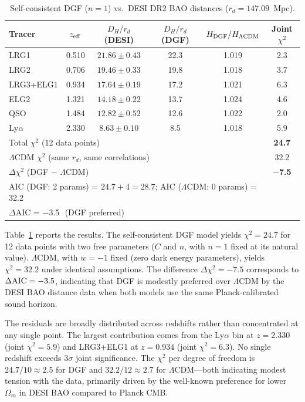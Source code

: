 \documentclass[12pt,a4paper]{article}
\begin{document}
\begin{table}[htbp]
\centering
\caption{Self-consistent DGF ($n=1$) vs.\ DESI DR2 BAO distances ($r_d=147.09$~Mpc).}
\label{tab:desi}
\begin{tabular}{lccccc}
\toprule
Tracer & $z_{\rm eff}$ & $D_H/r_d$ (DESI) & $D_H/r_d$ (DGF) & $H_{\rm DGF}/H_{\Lambda\rm CDM}$ & Joint $\chi^2$ \\
\midrule
LRG1      & 0.510 & $21.86\pm0.43$ & 22.3 & 1.019 & 2.3 \\
LRG2      & 0.706 & $19.46\pm0.33$ & 19.8 & 1.018 & 3.7 \\
LRG3+ELG1 & 0.934 & $17.64\pm0.19$ & 17.2 & 1.021 & 6.3 \\
ELG2      & 1.321 & $14.18\pm0.22$ & 13.7 & 1.024 & 4.6 \\
QSO       & 1.484 & $12.82\pm0.52$ & 12.6 & 1.022 & 2.0 \\
Ly$\alpha$ & 2.330 & $8.63\pm0.10$  & 8.5  & 1.018 & 5.9 \\
\midrule
\multicolumn{5}{l}{Total $\chi^2$ (12 data points)} & {\bf 24.7} \\
\multicolumn{5}{l}{$\Lambda$CDM $\chi^2$ (same $r_d$, same correlations)} & 32.2 \\
\multicolumn{5}{l}{$\Delta\chi^2$ (DGF $-$ $\Lambda$CDM)} & {\bf $-$7.5} \\
\multicolumn{5}{l}{AIC (DGF: 2 params) = $24.7+4=28.7$; AIC ($\Lambda$CDM: 0 params) = 32.2} & \\
\multicolumn{5}{l}{$\Delta$AIC = $-$3.5$~~~$(DGF preferred)} & \\
\bottomrule
\end{tabular}
\end{table}

Table~\ref{tab:desi} reports the results. The self-consistent DGF model yields $\chi^2=24.7$ for 12 data points with two free parameters ($C$ and $n$, with $n=1$ fixed at its natural value). $\Lambda$CDM, with $w=-1$ fixed (zero dark energy parameters), yields $\chi^2=32.2$ under identical assumptions. The difference $\Delta\chi^2=-7.5$ corresponds to $\Delta{\rm AIC}=-3.5$, indicating that DGF is modestly preferred over $\Lambda$CDM by the DESI BAO distance data when both models use the same Planck-calibrated sound horizon.

The residuals are broadly distributed across redshifts rather than concentrated at any single point. The largest contribution comes from the Ly$\alpha$ bin at $z=2.330$ (joint $\chi^2=5.9$) and LRG3+ELG1 at $z=0.934$ (joint $\chi^2=6.3$). No single redshift exceeds $3\sigma$ joint significance. The $\chi^2$ per degree of freedom is $24.7/10\approx2.5$ for DGF and $32.2/12\approx2.7$ for $\Lambda$CDM---both indicating modest tension with the data, primarily driven by the well-known preference for lower $\Omega_m$ in DESI BAO compared to Planck CMB.
\end{document}
